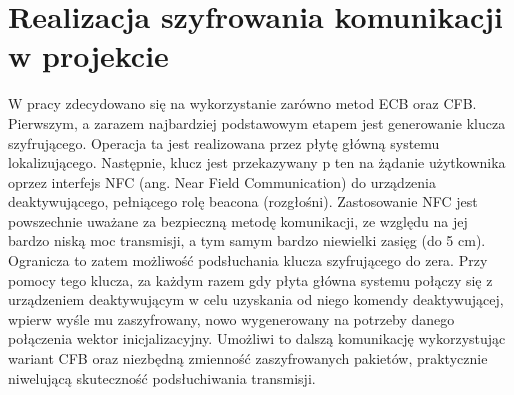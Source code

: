 \section{Realizacja szyfrowania komunikacji w projekcie}
W pracy zdecydowano się na wykorzystanie zarówno metod ECB oraz CFB. Pierwszym, a zarazem najbardziej podstawowym etapem jest generowanie klucza szyfrującego. Operacja ta jest realizowana przez płytę główną systemu lokalizującego. Następnie, klucz jest przekazywany p ten na żądanie użytkownika oprzez interfejs NFC (ang. Near Field Communication) do urządzenia deaktywującego, pełniącego rolę beacona (rozgłośni). Zastosowanie NFC jest powszechnie uważane za bezpieczną metodę komunikacji, ze względu na jej bardzo niską moc transmisji, a tym samym bardzo niewielki zasięg (do 5 cm). Ogranicza to zatem możliwość podsłuchania klucza szyfrującego do zera. Przy pomocy tego klucza, za każdym razem gdy płyta główna systemu połączy się z urządzeniem deaktywującym w celu uzyskania od niego komendy deaktywującej, wpierw wyśle mu zaszyfrowany, nowo wygenerowany na potrzeby danego połączenia wektor inicjalizacyjny. Umożliwi to dalszą komunikację wykorzystując wariant CFB oraz niezbędną zmienność zaszyfrowanych pakietów, praktycznie niwelującą skuteczność podsłuchiwania transmisji. 